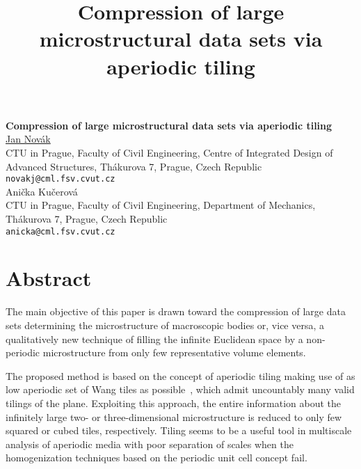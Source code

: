 \title{Compression of large microstructural data sets via aperiodic tiling}
\author{} \institute{}

\begin{center}

\textbf{\Large Compression of large microstructural data sets via aperiodic tiling}\\
\vspace{10mm}
{\large \underline{Jan Nov\'{a}k}}\\
CTU in Prague, Faculty of Civil Engineering, Centre of Integrated Design of Advanced Structures, Th\'akurova 7, Prague, Czech Republic\\
{\tt novakj@cml.fsv.cvut.cz}\\
\vspace{4mm}
{\large Ani\v{c}ka Ku\v{c}erov\'{a}}\\
CTU in Prague, Faculty of Civil Engineering, Department of Mechanics, Th\'akurova 7, Prague, Czech Republic\\
{\tt anicka@cml.fsv.cvut.cz}

\end{center}

\section*{Abstract}

The main objective of this paper is drawn toward the compression of large data sets determining the microstructure of macroscopic bodies or, vice versa, a qualitatively new technique of filling the infinite Euclidean space by a non-periodic microstructure from only few representative volume elements.

The proposed method is based on the concept of aperiodic tiling making use of as low aperiodic set of Wang tiles as possible~\cite{Cohen:2003:WTI:1201775.882265,Culik96}, which admit uncountably many valid tilings of the plane. Exploiting this approach, the entire information about the infinitely large two- or three-dimensional microstructure is reduced to only few squared or cubed tiles, respectively. Tiling seems to be a useful tool in multiscale analysis of aperiodic media with poor separation of scales when the homogenization techniques based on the periodic unit cell concept fail.

